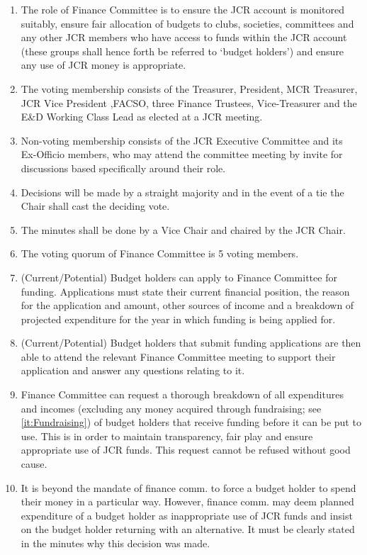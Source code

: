 \begin{enumerate}
    \item The role of Finance Committee is to ensure the JCR account is monitored suitably, ensure fair allocation of budgets to clubs, societies, committees and any other JCR members who have access to funds within the JCR account (these groups shall hence forth be referred to ‘budget holders’) and ensure any use of JCR money is appropriate.
    \item The voting membership consists of the Treasurer, President, MCR Treasurer, JCR Vice President ,FACSO, three Finance Trustees, Vice-Treasurer and the E\&D Working Class Lead as elected at a JCR meeting.
    \item Non-voting membership consists of the JCR Executive Committee and its Ex-Officio members, who may attend the committee meeting by invite for discussions based specifically around their role.
    \item Decisions will be made by a straight majority and in the event of a tie the Chair shall cast the deciding vote.
    \item The minutes shall be done by a Vice Chair and chaired by the JCR Chair.
    \item The voting quorum of Finance Committee is 5 voting members.
    \item (Current/Potential) Budget holders can apply to Finance Committee for funding. Applications must state their current financial position, the reason for the application and amount, other sources of income and a breakdown of projected expenditure for the year in which funding is being applied for.
    \item (Current/Potential) Budget holders that submit funding applications are then able to attend the relevant Finance Committee meeting to support their application and answer any questions relating to it.
    \item Finance Committee can request a thorough breakdown of all expenditures and incomes (excluding any money acquired through fundraising; see \ref{it:Fundraising}) of budget holders that receive funding before it can be put to use. This is in order to maintain transparency, fair play and ensure appropriate use of JCR funds. This request cannot be refused without good cause.
    \item It is beyond the mandate of finance comm. to force a budget holder to spend their money in a particular way. However, finance comm. may deem planned expenditure of a budget holder as inappropriate use of JCR funds and insist on the budget holder returning with an alternative. It must be clearly stated in the minutes why this decision was made.

\end{enumerate}
